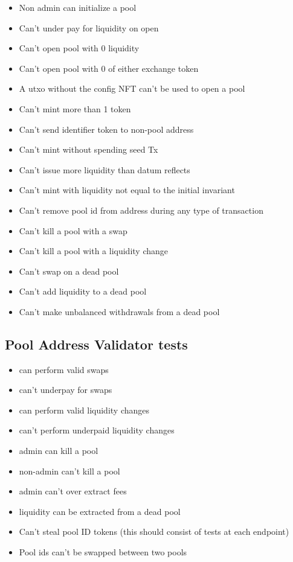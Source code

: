 \documentclass{article}
\begin{document}
\begin{itemize}
	\item Non admin can initialize a pool
	\item Can't under pay for liquidity on open
	\item Can't open pool with 0 liquidity
	\item Can't open pool with 0 of either exchange token
	\item A utxo without the config NFT can't be used to open a pool
	\item Can't mint more than 1 token
	\item Can't send identifier token to non-pool address
	\item Can't mint without spending seed Tx
	\item Can't issue more liquidity than datum reflects
	\item Can't mint with liquidity not equal to the initial invariant
	\item Can't remove pool id from address during any type of transaction
	\item Can't kill a pool with a swap
	\item Can't kill a pool with a liquidity change
	\item Can't swap on a dead pool
	\item Can't add liquidity to a dead pool
	\item Can't make unbalanced withdrawals from a dead pool
\end{itemize}

\subsection{Pool Address Validator tests}

\begin{itemize}
	\item can perform valid swaps
	\item can't underpay for swaps
	\item can perform valid liquidity changes
	\item can't perform underpaid liquidity changes
	\item admin can kill a pool
	\item non-admin can't kill a pool
	\item admin can't over extract fees
	\item liquidity can be extracted from a dead pool
	\item Can't steal pool ID tokens (this should consist of tests at each endpoint)
	\item Pool ids can't be swapped between two pools
\end{itemize}
\end{document}
